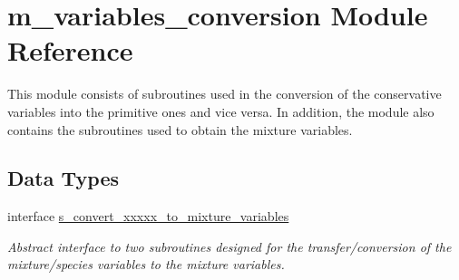 \hypertarget{namespacem__variables__conversion}{}\section{m\+\_\+variables\+\_\+conversion Module Reference}
\label{namespacem__variables__conversion}


This module consists of subroutines used in the conversion of the conservative variables into the primitive ones and vice versa. In addition, the module also contains the subroutines used to obtain the mixture variables.  


\subsection*{Data Types}
\begin{DoxyCompactItemize}
\item 
interface \hyperlink{interfacem__variables__conversion_1_1s__convert__xxxxx__to__mixture__variables}{s\+\_\+convert\+\_\+xxxxx\+\_\+to\+\_\+mixture\+\_\+variables}
\begin{DoxyCompactList}\small\item\em Abstract interface to two subroutines designed for the transfer/conversion of the mixture/species variables to the mixture variables. \end{DoxyCompactList}\end{DoxyCompactItemize}
